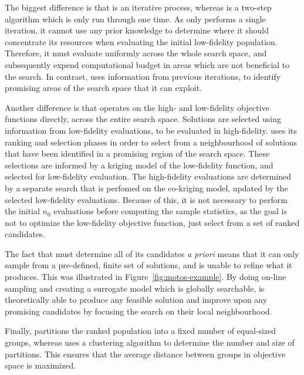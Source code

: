 The biggest difference is that \AlgName{} is an iterative process, whereas \motos{} is a two-step algorithm which is only run through one time. As \motos{} only performs a single iteration, it cannot use any prior knowledge to determine where it should concentrate its resources when evaluating the initial low-fidelity population. Therefore, it must evaluate uniformly across the whole search space, and subsequently expend computational budget in areas which are not beneficial to the search. In contrast, \AlgName{} uses information from previous iterations, to identify promising areas of the search space that it can exploit.

Another difference is that \motos{} operates on the high- and low-fidelity objective functions directly, across the entire search space. Solutions are selected using information from low-fidelity evaluations, to be evaluated in high-fidelity. \AlgName{} uses its ranking and selection phases in order to select from a neighbourhood of solutions that have been identified in a promising region of the search space. These selections are informed by a kriging model of the low-fidelity function, and selected for low-fidelity evaluation. The high-fidelity evaluations are determined by a separate search that is perfomed on the co-kriging model, updated by the selected low-fidelity evaluations. Because of this, it is not necessary to perform the initial $n_0$ evaluations before computing the sample statistics, as the goal is not to optimize the low-fidelity objective function, just select from a set of ranked candidates.

The fact that \motos{} must determine all of its candidates \emph{a priori} means that it can only sample from a pre-defined, finite set of solutions, and is unable to refine what it produces. This was illustrated in Figure~\ref{fig:motos-example}. By doing on-line sampling and creating a surrogate model which is globally searchable, \AlgName{} is theoretically able to produce any feasible solution and improve upon any promising candidates by focusing the search on their local neighbourhood.

Finally, \motos{} partitions the ranked population into a fixed number of equal-sized groups, whereas \AlgName{} uses a clustering algorithm to determine the number and size of partitions. This ensures that the average distance between groups in objective space is maximized. %